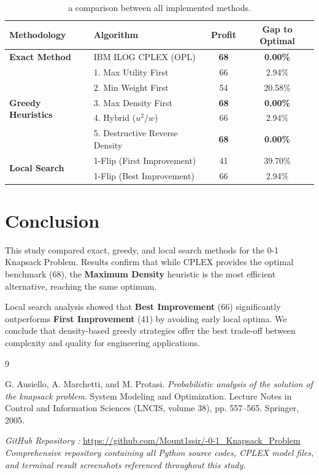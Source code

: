 \documentclass[11pt,a4paper]{article}
\begin{document}
\begin{table}[htbp]
    \centering
    \begin{tabular}{|l|l|c|c|}
        \hline
        \textbf{Methodology} & \textbf{Algorithm} & \textbf{Profit} & \textbf{Gap to Optimal} \\
        \hline
        \textbf{Exact Method} & IBM ILOG CPLEX (OPL) & \textbf{68} & \textbf{0.00\%} \\
        \hline
        \multirow{5}{*}{\textbf{Greedy Heuristics}} & 1. Max Utility First & 66 & 2.94\% \\
        & 2. Min Weight First & 54 & 20.58\% \\
        & 3. Max Density First & \textbf{68} & \textbf{0.00\%} \\
        & 4. Hybrid ($u^2/w$) & 66 & 2.94\% \\
        & 5. Destructive Reverse Density & \textbf{68} & \textbf{0.00\%} \\
        \hline
        \multirow{2}{*}{\textbf{Local Search}} & 1-Flip (First Improvement) & 41 & 39.70\% \\
        & 1-Flip (Best Improvement) & 66 & 2.94\% \\
        \hline
    \end{tabular}
    \caption{a comparison between all implemented methods.}
    \label{tab:global_comparison}
\end{table}


\section{Conclusion}

This study compared exact, greedy, and local search methods for the 0-1 Knapsack Problem. Results confirm that while CPLEX provides the optimal benchmark (68), the \textbf{Maximum Density} heuristic is the most efficient alternative, reaching the same optimum. 

Local search analysis showed that \textbf{Best Improvement} (66) significantly outperforms \textbf{First Improvement} (41) by avoiding early local optima. We conclude that density-based greedy strategies offer the best trade-off between complexity and quality for engineering applications.
\begin{thebibliography}{9}

G. Ausiello, A. Marchetti, and M. Protasi. 
\textit{Probabilistic analysis of the solution of the knapsack problem}. 
System Modeling and Optimization. 
Lecture Notes in Control and Information Sciences (LNCIS, volume 38), pp. 557--565. Springer, 2005.

\textit{GitHub Repository :}
\url{https://github.com/Mount1ssir/-0-1_Knapsack_Problem}
\\ \textit{Comprehensive repository containing all Python source codes, CPLEX model files, and terminal result screenshots referenced throughout this study.}

\end{thebibliography}
\enddocument
\end{document}
